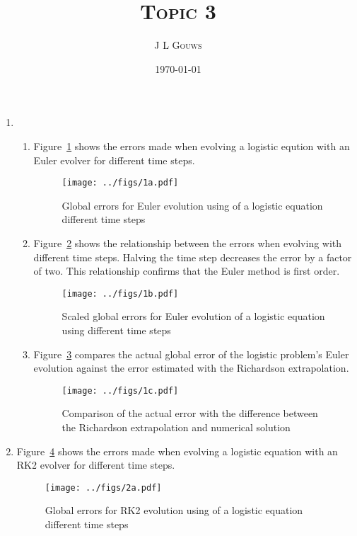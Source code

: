 \documentclass[12pt,a4]{article}
\title{
\textsc{Topic 3}
}
\author{\textsc{J L Gouws}
}
\date{\today
\\[1cm]}
\begin{document}
\thispagestyle{empty}

\maketitle

\begin{enumerate}
  \item
    \begin{enumerate}
      \item
        Figure~\ref{fig:1a} shows the errors made when evolving a logistic eqution with an Euler evolver for different time steps.
        \begin{figure}[H]
          \centering
          \texttt{[image: ../figs/1a.pdf]} 
          \caption{Global errors for Euler evolution using of a logistic equation different time steps}
          \label{fig:1a}
        \end{figure}

      \item
        Figure~\ref{fig:1b} shows the relationship between the errors when evolving with different time steps.
        Halving the time step decreases the error by a factor of two.
        This relationship confirms that the Euler method is first order.

        \begin{figure}[H]
          \centering
          \texttt{[image: ../figs/1b.pdf]}
          \caption{Scaled global errors for Euler evolution of a logistic equation using different time steps}
          \label{fig:1b}
        \end{figure}

      \item
        Figure~\ref{fig:1c} compares the actual global error of the logistic problem's Euler evolution against the error estimated with the Richardson extrapolation.
        \begin{figure}[H]
          \centering
          \texttt{[image: ../figs/1c.pdf]}
          \caption{Comparison of the actual error with the difference between the Richardson extrapolation and numerical solution}
          \label{fig:1c}
        \end{figure}


    \end{enumerate}
  \item
    \begin{enumerate}
      Figure~\ref{fig:2a} shows the errors made when evolving a logistic equation with an RK2 evolver for different time steps.
        \begin{figure}[H]
          \centering
          \texttt{[image: ../figs/2a.pdf]}
          \caption{Global errors for RK2 evolution using of a logistic equation different time steps}
          \label{fig:2a}
        \end{figure}


\end{enumerate}
\end{enumerate}
\end{document}

